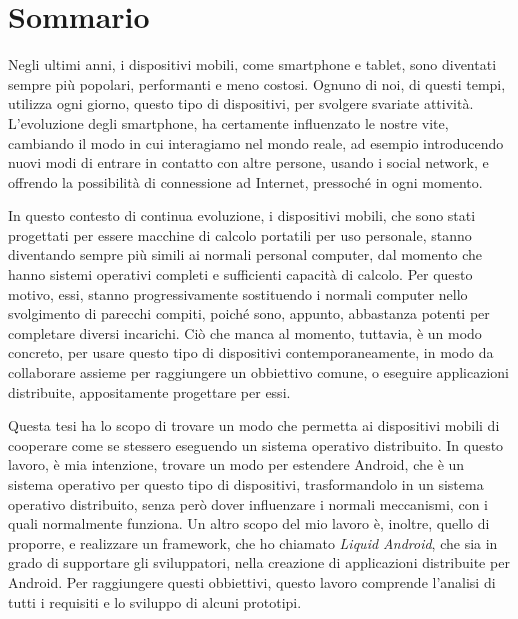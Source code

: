 %
%
\cleardoublepage
%
%

%
\chapter*{Sommario}

Negli ultimi anni, i dispositivi mobili, come smartphone e tablet, sono diventati sempre più popolari, performanti e meno costosi. Ognuno di noi, di questi tempi, utilizza ogni giorno, questo tipo di dispositivi, per svolgere svariate attività. L'evoluzione degli smartphone, ha certamente influenzato le nostre vite, cambiando il modo in cui interagiamo nel mondo reale, ad esempio introducendo nuovi modi di entrare in contatto con altre persone, usando i social network, e offrendo la possibilità di connessione ad Internet, pressoché in ogni momento.\\
\par In questo contesto di continua evoluzione, i dispositivi mobili, che sono stati progettati per essere macchine di calcolo portatili per uso personale, stanno diventando sempre più simili ai normali personal computer, dal momento che hanno sistemi operativi completi e sufficienti capacità di calcolo. Per questo motivo, essi, stanno progressivamente sostituendo i normali computer nello svolgimento di parecchi compiti, poiché sono, appunto, abbastanza potenti per completare diversi incarichi. Ciò che manca al momento, tuttavia, è un modo concreto, per usare questo tipo di dispositivi contemporaneamente, in modo da collaborare assieme per raggiungere un obbiettivo comune, o eseguire applicazioni distribuite, appositamente progettare per essi.\\
\par Questa tesi ha lo scopo di trovare un modo che permetta ai dispositivi mobili di cooperare come se stessero eseguendo un sistema operativo distribuito. In questo lavoro, è mia intenzione, trovare un modo per estendere Android, che è un sistema operativo per questo tipo di dispositivi, trasformandolo in un sistema operativo distribuito, senza però dover influenzare i normali meccanismi, con i quali normalmente funziona. Un altro scopo del mio lavoro è, inoltre, quello di proporre, e realizzare un framework, che ho chiamato \textit{Liquid Android}, che sia in grado di supportare gli sviluppatori, nella creazione di applicazioni distribuite per Android. Per raggiungere questi obbiettivi, questo lavoro comprende l'analisi di tutti i requisiti e lo sviluppo di alcuni prototipi.\\
